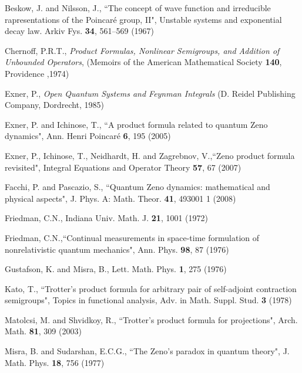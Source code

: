\documentclass[aip,jmp,12pt
]{revtex4}
\theoremstyle{definition}
\begin{document}
\begin{thebibliography}{20}
%
%

 Beskow, J. and Nilsson, J.,
{``The concept of wave function and irreducible rapresentations of
the Poincar{\'e} group, II"}, Unstable systems and exponential
decay law. Arkiv Fys.
  \textbf{34}, 561--569 (1967)


Chernoff, P.R.T.,
\textit{Product Formulas, Nonlinear Semigroups,
and Addition of Unbounded Operators},
(Memoirs of the American Mathematical Society \textbf{140}, Providence ,1974)


Exner, P.,
\textit{Open Quantum Systems and Feynman Integrals}
(D. Reidel Publishing Company, Dordrecht, 1985)


Exner, P. and Ichinose, T.,
{``A product formula related to quantum Zeno dynamics"}, Ann. Henri
Poincar\'e
  \textbf{6}, 195 (2005)


Exner, P., Ichinose, T., Neidhardt, H. and Zagrebnov, V.,{``Zeno product formula revisited"},
 Integral Equations and Operator Theory
\textbf{57}, 67 (2007)


Facchi, P. and Pascazio, S., {``Quantum Zeno dynamics: mathematical and physical aspects"}, J. Phys. A: Math. Theor. \textbf{41}, 493001 1 (2008)


Friedman, C.N.,
Indiana Univ. Math. J. \textbf{21}, 1001 (1972)

Friedman, C.N.,{``Continual measurements in space-time formulation of nonrelativistic quantum mechanics"},
Ann. Phys. \textbf{98}, 87 (1976)

Gustafson, K. and Misra, B.,
Lett. Math. Phys. \textbf{1}, 275  (1976)


Kato, T.,
{``Trotter's product formula for arbitrary pair of self-adjoint contraction semigroups"},
Topics in functional analysis, Adv. in Math. Suppl. Stud.
\textbf{3} (1978)


Matolcsi, M. and Shvidkoy, R.,
{``Trotter's product formula for projections"},
Arch. Math. \textbf{81}, 309 (2003)


Misra, B. and Sudarshan, E.C.G.,
{``The Zeno's paradox in quantum theory"}, J. Math. Phys.
  \textbf{18}, 756 (1977)


\end{thebibliography}
\end{document}

